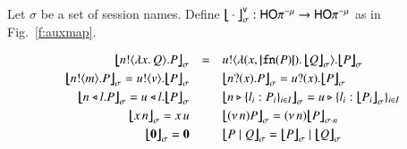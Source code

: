 \begin{definition}\label{d:trabs}\label{d:auxmap}
	Let $\sigma$ be a set of session names.
	Define $\big\lfloor\!\!\big\lfloor\cdot\big\rfloor\!\!\big\rfloor^\mathsf{v}_\sigma: \mathsf{HO}\pi^{-\mu} \to \mathsf{HO}\pi^{-\mu}$ as in Fig.~\ref{f:auxmap}.
%
\begin{figure}[t]
\[
\small
\begin{array}{rcl}
	\auxmapp{\bout{n}{\abs{x}{Q}} P}{{}}{\sigma} &=&
		\bout{u}{\abs{(x,\vmap{\fn{P}})}{\auxmapp{Q}{{}}{\sigma}}} \auxmapp{P}{{}}{\sigma}
\\[1mm]
\auxmapp{\bout{n}{m} P}{{}}{\sigma} =
	    \bout{u}{v}\auxmapp{P}{{}}{\sigma} 
& & 
			\auxmapp{\binp{n}{x} P}{{}}{\sigma} =
		\binp{u}{x} \auxmapp{P}{{}}{\sigma} 
\\[1mm]
	\auxmapp{\bsel{n}{l} P}{{}}{\sigma} =
		\bsel{u}{l} \auxmapp{P}{{}}{\sigma} 
& & 
	\auxmapp{\bbra{n}{l_i:P_i}_{i \in I}}{{}}{\sigma}  = 
		\bbra{u}{l_i:\auxmapp{P_i}{{}}{\sigma}}_{i \in I}
	\vspace{1mm} \\
	\auxmapp{\appl{x}{n}}{{}}{\sigma}  = 
		\appl{x}{u} 
& & 
\auxmapp{\news{n} P}{{}}{\sigma}  =  \news{n} \auxmapp{P}{{}}{{\sigma \cat n}}
	\vspace{1mm} \\
	\auxmapp{\inact}{{}}{\sigma}  =  \inact & & 
	\auxmapp{P \Par Q}{{}}{\sigma}  =  \auxmapp{P}{{}}{\sigma} \Par \auxmapp{Q}{{}}{\sigma} 
\end{array}
\]

\end{figure}
\end{definition}
